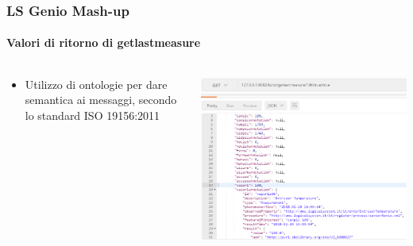\documentclass{beamer}
\begin{document}
\begin{frame}
\frametitle{LS Genio Mash-up}
\framesubtitle{Valori di ritorno di getlastmeasure}
\begin{columns}[T] %
	\begin{column}{.38\textwidth}
		\begin{itemize}
			\small
			\item Utilizzo di ontologie per dare semantica ai messaggi, secondo lo standard ISO 19156:2011
		\end{itemize}
		
	\end{column}%
	\hfill%
	\begin{column}{.58\textwidth}
		\includegraphics[width=1\textwidth]{images/Postman1-corretto.png}
	\end{column}%
\end{columns}

\end{frame}
\end{document}
